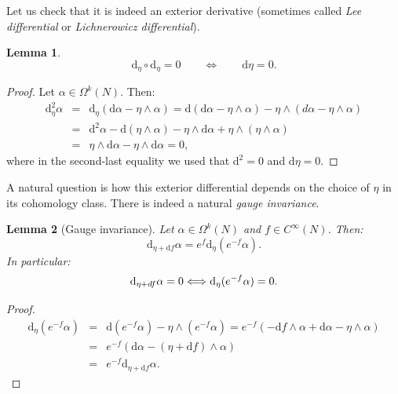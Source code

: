 \documentclass[11pt]{article}
\newtheorem{lemma}{Lemma}
\theoremstyle{definition}
\def\d{\mathrm{d}}
\begin{document}
\noindent Let us check that it is indeed an exterior derivative (sometimes called {\it Lee differential} or {\it Lichnerowicz differential}).\\

\begin{lemma}\label{lemma1}
$$ \d_\eta \circ \d_\eta =0 \qquad \Longleftrightarrow \qquad \d\eta=0.$$
\end{lemma} 

\begin{proof}
Let $\alpha \in \Omega^k(N)$. Then:
\begin{eqnarray*}
\d^2_\eta \alpha &=& \d_\eta \left(
\d\alpha - \eta \wedge \alpha
\right) = \d \left(
\d\alpha - \eta \wedge \alpha
\right) - \eta \wedge \left(
d\alpha - \eta \wedge \alpha
\right) 
\\
&=& \d^2 \alpha - \d (\eta \wedge \alpha) - \eta \wedge \d\alpha + \eta \wedge \left( \eta \wedge \alpha \right)\\
&=& \eta \wedge \d \alpha - \eta \wedge \d\alpha = 0,
\end{eqnarray*}
where in the second-last equality we used that $\d^2=0$ and $\d\eta=0$.
\end{proof}


\bigskip

A natural question is how this exterior differential depends on the choice of $\eta$ in its cohomology class. There is indeed a natural {\it gauge invariance}.\\

\begin{lemma}[Gauge invariance]\label{lemma2}
  Let $\alpha\in\Omega^k(N)$ and $f\in C^\infty(N)$. Then:
$$\d_{\eta+\d f}\alpha= e^f \d_\eta(e^{-f}\alpha).$$
In particular:
$$ \d_{\eta+df}\alpha=0 \Longleftrightarrow \d_\eta(e^{-f}\alpha)=0. \\$$
\end{lemma} 



\bigskip
\begin{proof}
\begin{eqnarray*}
\d_{\eta} \left(e^{-f} \alpha \right) &=&
\d\left(e^{-f} \alpha \right) - \eta \wedge \left(e^{-f} \alpha \right) =
e^{-f} \left(-\d f \wedge \alpha + \d\alpha - \eta \wedge \alpha \right)\\
&=&
e^{-f} \left(\d\alpha - (\eta+\d f) \wedge \alpha \right)\\
&=& e^{-f} \d_{\eta+\d f}\alpha.
\end{eqnarray*}
\end{proof}
\end{document}
